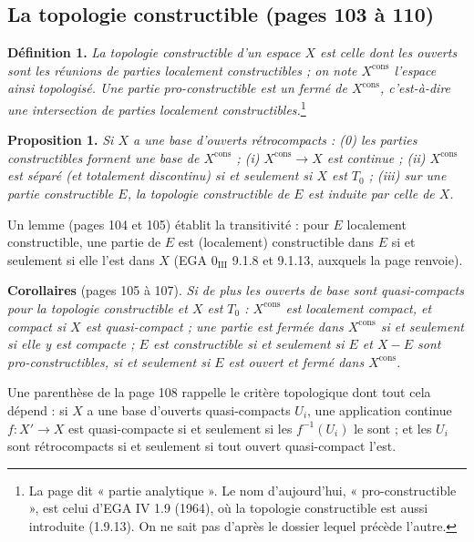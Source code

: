 \documentclass[11pt,a4paper]{article}
\begin{document}
\subsection*{La topologie constructible (pages 103 à 110)}

\textbf{Définition 1.} \emph{La topologie constructible d'un espace $X$ est celle
dont les ouverts sont les réunions de parties localement constructibles ; on
note $X^{\mathrm{cons}}$ l'espace ainsi topologisé. Une partie pro-constructible
est un fermé de $X^{\mathrm{cons}}$, c'est-à-dire une intersection de parties
localement constructibles.}\footnote{La page dit « partie analytique ». Le
nom d'aujourd'hui, « pro-constructible », est celui d'EGA IV 1.9 (1964), où
la topologie constructible est aussi introduite (1.9.13). On ne sait pas
d'après le dossier lequel précède l'autre.}

\textbf{Proposition 1.} \emph{Si $X$ a une base d'ouverts rétrocompacts :
(0) les parties constructibles forment une base de $X^{\mathrm{cons}}$ ; (i)
$X^{\mathrm{cons}} \to X$ est continue ; (ii) $X^{\mathrm{cons}}$ est séparé (et
totalement discontinu) si et seulement si $X$ est $T_0$ ; (iii) sur une
partie constructible $E$, la topologie constructible de $E$ est induite par
celle de $X$.}

Un lemme (pages 104 et 105) établit la transitivité : pour $E$ localement
constructible, une partie de $E$ est (localement) constructible dans $E$ si et
seulement si elle l'est dans $X$ (EGA $0_{\mathrm{III}}$ 9.1.8 et 9.1.13,
auxquels la page renvoie).

\textbf{Corollaires} (pages 105 à 107). \emph{Si de plus les ouverts de base
sont quasi-compacts pour la topologie constructible et $X$ est $T_0$ :
$X^{\mathrm{cons}}$ est localement compact, et compact si $X$ est quasi-compact ;
une partie est fermée dans $X^{\mathrm{cons}}$ si et seulement si elle y est
compacte ; $E$ est constructible si et seulement si $E$ et $X - E$ sont
pro-constructibles, si et seulement si $E$ est ouvert et fermé dans
$X^{\mathrm{cons}}$.}

Une parenthèse de la page 108 rappelle le critère topologique dont tout
cela dépend : si $X$ a une base d'ouverts quasi-compacts $U_i$, une application
continue $f : X' \to X$ est quasi-compacte si et seulement si les
$f^{-1}(U_i)$ le sont ; et les $U_i$ sont rétrocompacts si et seulement si tout
ouvert quasi-compact l'est.
\end{document}

